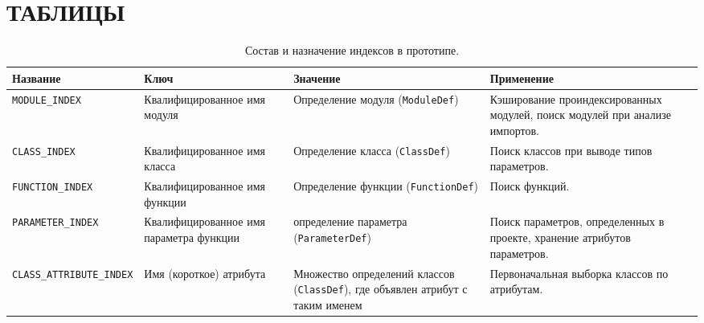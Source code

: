 \chapter{ТАБЛИЦЫ}
\label{app:tables}

\begin{turn}{90}
\begin{minipage}{0.69\paperheight}
  \begin{table}[H]
    \small
    \caption{Состав и назначение индексов в прототипе.}
    \label{tab:indexes-ref}
    \begin{tabularx}{\textwidth}{ |X|X|X|X| }
      \hline
      Название & Ключ & Значение & Применение \\
      \hline
      \texttt{MODULE\_INDEX} & Квалифицированное имя модуля & Определение модуля
      (\texttt{ModuleDef})
      &  Кэширование проиндексированных модулей, поиск модулей при анализе импортов.
      \\ \hline

      \texttt{CLASS\_INDEX} & Квалифицированное имя класса & Определение класса
      (\texttt{ClassDef})
      & Поиск классов при выводе типов параметров. \\ \hline 

      \texttt{FUNCTION\_INDEX} & Квалифицированное имя функции & Определение функции
      (\texttt{FunctionDef}) & Поиск функций. \\ \hline

      \texttt{PARAMETER\_INDEX} & Квалифицированное имя параметра функции & определение
      параметра (\texttt{ParameterDef}) & Поиск параметров, определенных в проекте,
      хранение атрибутов параметров. \\ \hline

      \texttt{CLASS\_ATTRIBUTE\_INDEX} & Имя (короткое) атрибута & Множество
      определений классов (\texttt{ClassDef}), где 
      объявлен атрибут с таким именем & Первоначальная выборка классов по атрибутам.
      \\ \hline

    \end{tabularx}
  \end{table}
\end{minipage}
\end{turn}


